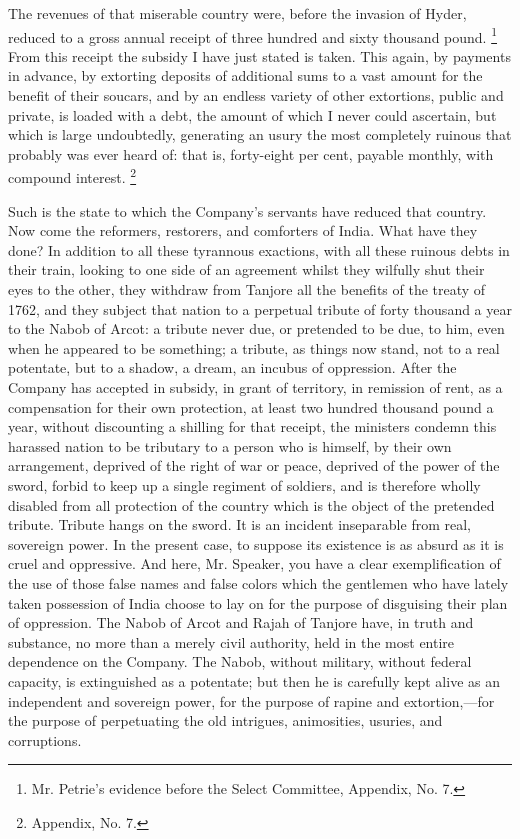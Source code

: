 The revenues of that miserable country were, before the invasion of Hyder, reduced to a gross annual receipt of three hundred and sixty thousand pound.
\footnote{ Mr. Petrie's evidence before the Select Committee, Appendix, No. 7.}
 From this receipt the subsidy I have just stated is taken. This again, by payments in advance, by extorting deposits of additional sums to a vast amount for the benefit of their soucars, and by an endless variety of other extortions, public and private, is loaded with a debt, the amount of which I never could ascertain, but which is large undoubtedly, generating an usury the most completely ruinous that probably was ever heard of: that is, forty-eight per cent, payable monthly, with compound interest.
\footnote{ Appendix, No. 7.}


Such is the state to which the Company's servants have reduced that country. Now come the reformers, restorers, and comforters of India. What have they done? In addition to all these tyrannous exactions, with all these ruinous debts in their train, looking to one side of an agreement whilst they wilfully shut their eyes to the other, they withdraw from Tanjore all the benefits of the treaty of 1762, and they subject that nation to a perpetual tribute of forty thousand a year to the Nabob of Arcot: a tribute never due, or pretended to be due, to him, even when he appeared to be something; a tribute, as things now stand, not to a real potentate, but to a shadow, a dream, an incubus of oppression. After the Company has accepted in subsidy, in grant of territory, in remission of rent, as a compensation for their own protection, at least two hundred thousand pound a year, without discounting a shilling for that receipt, the ministers condemn this harassed nation to be tributary to a person who is himself, by their own arrangement, deprived of the right of war or peace, deprived of the power of the sword, forbid to keep up a single regiment of soldiers, and is therefore wholly disabled from all protection of the country which is the object of the pretended tribute. Tribute hangs on the sword. It is an incident inseparable from real, sovereign power. In the present case, to suppose its existence is as absurd as it is cruel and oppressive. And here, Mr. Speaker, you have a clear exemplification of the use of those false names and false colors which the gentlemen who have lately taken possession of India choose to lay on for the purpose of disguising their plan of oppression. The Nabob of Arcot and Rajah of Tanjore have, in truth and substance, no more than a merely civil authority, held in the most entire dependence on the Company. The Nabob, without military, without federal capacity, is extinguished as a potentate; but then he is carefully kept alive as an independent and sovereign power, for the purpose of rapine and extortion,—for the purpose of perpetuating the old intrigues, animosities, usuries, and corruptions.

